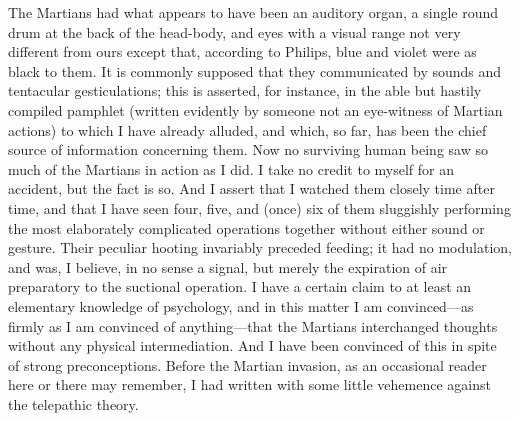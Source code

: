 The Martians had what appears to have been an auditory organ, a single round drum at the back of the head-body, and eyes with a visual range not very different from ours except that, according to Philips, blue and violet were as black to them. It is commonly supposed that they communicated by sounds and tentacular gesticulations; this is asserted, for instance, in the able but hastily compiled pamphlet (written evidently by someone not an eye-witness of Martian actions) to which I have already alluded, and which, so far, has been the chief source of information concerning them. Now no surviving human being saw so much of the Martians in action as I did. I take no credit to myself for an accident, but the fact is so. And I assert that I watched them closely time after time, and that I have seen four, five, and (once) six of them sluggishly performing the most elaborately complicated operations together without either sound or gesture. Their peculiar hooting invariably preceded feeding; it had no modulation, and was, I believe, in no sense a signal, but merely the expiration of air preparatory to the suctional operation. I have a certain claim to at least an elementary knowledge of psychology, and in this matter I am convinced—as firmly as I am convinced of anything—that the Martians interchanged thoughts without any physical intermediation. And I have been convinced of this in spite of strong preconceptions. Before the Martian invasion, as an occasional reader here or there may remember, I had written with some little vehemence against the telepathic theory.





